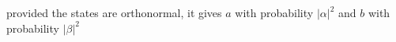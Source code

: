 \documentclass[preview]{standalone}
\begin{document}
\begin{center}
provided the states are orthonormal, it gives $a$ with probability $|\alpha|^2$ and $b$ with probability $|\beta|^2$
\end{center}
\end{document}
